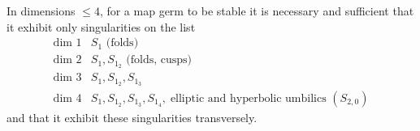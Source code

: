 In dimensions $\leq 4$, for a map germ to be stable it is necessary and sufficient that it exhibit only singularities on the list
$$
\begin{array}{ll}
\text{dim 1} & S_1 \text{ (folds)} \\
\text{dim 2} & S_1, S_{1_2} \text{ (folds, cusps)} \\
\text{dim 3} & S_1, S_{1_2}, S_{1_3} \\
\text{dim 4} & S_1, S_{1_2}, S_{1_3}, S_{1_4},\; \text{elliptic and hyperbolic umbilics } (S_{2,0})
\end{array}
$$
and that it exhibit these singularities transversely.
